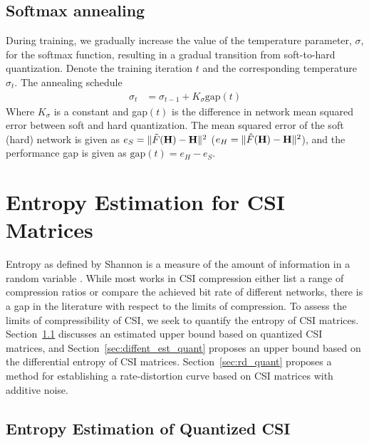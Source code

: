 \subsection{Softmax annealing}

During training, we gradually increase the value of the temperature parameter, $\sigma$, for the softmax function, resulting in a gradual transition from soft-to-hard quantization. Denote the training iteration $t$ and the corresponding temperature $\sigma_t$. The annealing schedule 
\begin{align*}
	\sigma_t &= \sigma_{t-1} + K_{\sigma}\text{gap}(t)
\end{align*}
Where $K_\sigma$ is a constant and gap$(t)$ is the difference in network mean squared error between soft and hard quantization. The mean squared error of the soft (hard) network is given as $e_S=\Arrowvert \tilde F(\mathbf H) - \mathbf H\Arrowvert^2$ ($e_H=\Arrowvert \hat F(\mathbf H) - \mathbf H\Arrowvert^2$), and the performance gap is given as $\text{gap}(t)=e_H - e_S$.

\section{Entropy Estimation for CSI Matrices}

Entropy as defined by Shannon is a measure of the amount of information in a random variable \cite{ref:Shannon1948Mathematical}. While most works in CSI compression either list a range of compression ratios or compare the achieved bit rate of different networks, there is a gap in the literature with respect to the limits of compression. To assess the limits of compressibility of CSI, we seek to quantify the entropy of CSI matrices.
Section~\ref{sec:ent_est_quant} discusses an estimated upper bound based on quantized CSI matrices, and Section~\ref{sec:diffent_est_quant} proposes an upper bound based on the differential entropy of CSI matrices. Section~\ref{sec:rd_quant} proposes a method for establishing a rate-distortion curve based on CSI matrices with additive noise.

\subsection{Entropy Estimation of Quantized CSI} \label{sec:ent_est_quant}

